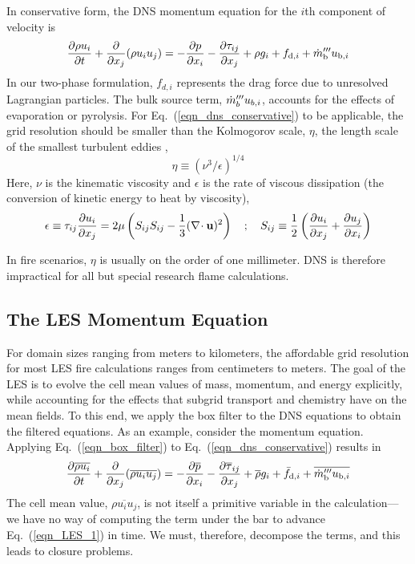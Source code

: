 In conservative form, the DNS momentum equation for the $i$th component of velocity is
\begin{equation}
\label{eqn_dns_conservative}
\frac{\partial \rho u_i}{\partial t} + \frac{\partial}{\partial x_j} (\rho u_i u_j) = -\frac{\partial p}{\partial x_i} - \frac{\partial \tau_{ij}}{\partial x_j} + \rho g_i + f_{{\rm d},i} + \dot{m}_{\rm b}^{\prime\prime\prime} u_{{\rm b},i}
\end{equation}
In our two-phase formulation, $f_{d,i}$ represents the drag force due to unresolved Lagrangian particles.  The bulk source term, $\dot{m}_b^{\prime\prime\prime} u_{b,i}$, accounts for the effects of evaporation or pyrolysis. For Eq.~(\ref{eqn_dns_conservative}) to be applicable, the grid resolution should be smaller than the Kolmogorov scale, $\eta$, the length scale of the smallest turbulent eddies \cite{Pope:2000},
\begin{equation}
\label{eqn_kolmogorov_scale}
\eta \equiv (\nu^3/\epsilon)^{1/4}
\end{equation}
Here, $\nu$ is the kinematic viscosity and $\epsilon$ is the rate of viscous dissipation (the conversion of kinetic energy to heat by viscosity),
\begin{equation}
\epsilon \equiv \tau_{ij} \frac{\partial u_i}{\partial x_j} = 2 \mu \left( S_{ij} S_{ij} - \frac{1}{3} (\nabla\!\cdot {\mathbf{u}})^2 \right) \quad ; \quad S_{ij} \equiv \frac{1}{2}\left(\frac{\partial u_i}{\partial x_j} + \frac{\partial u_j}{\partial x_i}\right) \label{eq:strain_tensor}
\end{equation}

In fire scenarios, $\eta$ is usually on the order of one millimeter.  DNS is therefore impractical for all but special research flame calculations.

\subsection{The LES Momentum Equation}

For domain sizes ranging from meters to kilometers, the affordable grid resolution for most LES fire calculations ranges from centimeters to meters.  The goal of the LES is to evolve the cell mean values of mass, momentum, and energy explicitly, while accounting for the effects that subgrid transport and chemistry have on the mean fields.  To this end, we apply the box filter to the DNS equations to obtain the filtered equations.  As an example, consider the momentum equation.  Applying Eq.~(\ref{eqn_box_filter}) to Eq.~(\ref{eqn_dns_conservative}) results in
\begin{equation}
\label{eqn_LES_1}
\frac{\partial \overline{\rho u_i}}{\partial t} + \frac{\partial}{\partial x_j} (\overline{\rho u_i u_j}) = -\frac{\partial \overline{p}}{\partial x_i} - \frac{\partial \overline{\tau}_{ij}}{\partial x_j} + \overline{\rho} g_i + \bar{f}_{{\rm d},i} + \overline{\dot{m}_{\rm b}^{\prime\prime\prime} u_{{\rm b},i}}
\end{equation}
The cell mean value, $\overline{\rho u_i u_j}$, is not itself a primitive variable in the calculation---we have no way of computing the term under the bar to advance Eq.~(\ref{eqn_LES_1}) in time.  We must, therefore, decompose the terms, and this leads to closure problems.

